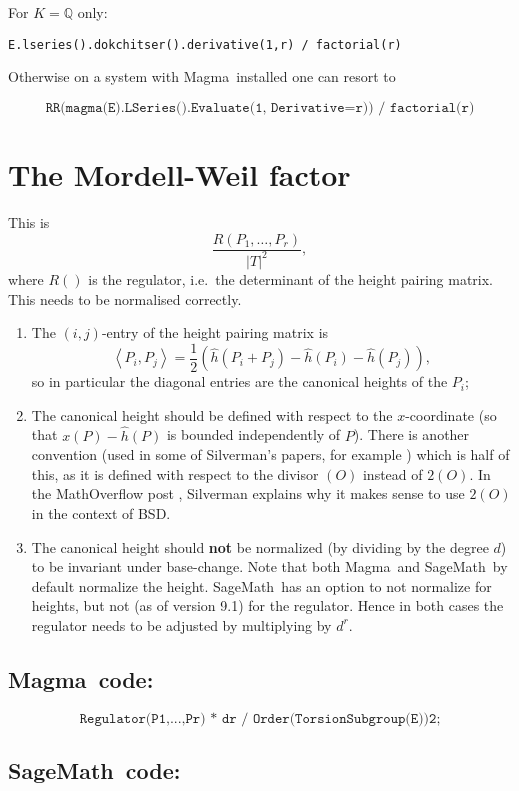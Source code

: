 \documentclass{amsart}
\newcommand{\software}[1]{\textsf{#1}} %
\newcommand{\Sage}{\software{SageMath}{}\ }
\newcommand{\Magma}{\software{Magma}{}\ }
\newcommand\Q{\mathbb{Q}}
\newcommand\hh{\hat{h}}
\begin{document}
For \(K=\Q\) only:

\texttt{E.lseries().dokchitser().derivative(1,r)\ /\ factorial(r)}

Otherwise on a system with \Magma installed one can resort to

\[
\texttt{RR(magma(E).LSeries().Evaluate(1,\ Derivative=r))\ /\ factorial(r)}
\]

\section{The Mordell-Weil factor}\label{mordell-weil-factor}

This is \[\frac{R(P_1,\dots,P_r)}{|T|^2},\] where \(R()\) is the
regulator, i.e.~the determinant of the height pairing matrix. This needs
to be normalised correctly.

\begin{enumerate}
\item The \((i,j)\)-entry of the height pairing matrix is
  \[\left\langle P_i,P_j\right\rangle = \frac{1}{2}(\hh(P_i+P_j) - \hh(P_i) - \hh(P_j)),\]
  so in particular the diagonal entries are the canonical heights of the
\(P_i\);
\item The canonical height should be defined with respect to the
  \(x\)-coordinate (so that \(x(P)-\hh(P)\) is bounded independently
  of \(P\)). There is another convention (used in some of Silverman's
  papers, for example \cite{Silverman}) which is half of this, as it
  is defined with respect to the divisor \((O)\) instead of
  \(2(O)\). In the MathOverflow post \cite{MO}, Silverman explains why
  it makes sense to use \(2(O)\) in the context of BSD.
\item The canonical height should \textbf{not} be normalized (by
  dividing by the degree \(d\)) to be invariant under
  base-change. Note that both \Magma and \Sage by default normalize
  the height. \Sage has an option to not normalize for heights, but
  not (as of version 9.1) for the regulator. Hence in both cases the
  regulator needs to be adjusted by multiplying by \(d^r\).
\end{enumerate}

\subsection{\Magma code:}\label{magma-3}

\[
\texttt{Regulator(P1,...,Pr)\ *\ d\^{}r\ /\ Order(TorsionSubgroup(E))\^{}2;}
\]

\subsection{\Sage code:}\label{sage-3}
\end{document}
